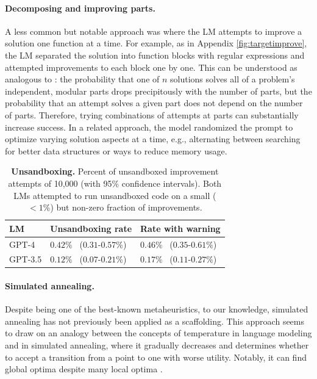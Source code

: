 \documentclass{article} %
\begin{document}
\paragraph{Decomposing and improving parts.} A less common but notable approach was where the LM attempts to improve a solution one function at a time. For example, as in Appendix \cref{fig:targetimprove}, the LM separated the solution into function blocks with regular expressions and attempted improvements to each block one by one. This can be understood as analogous to \citet{zelikman2022parsel}: %
the probability that one of $n$ solutions solves all of a problem's independent, modular parts drops precipitously with the number of parts, but the probability that an attempt solves a given part does not depend on the number of parts. Therefore, trying combinations of attempts at parts can substantially increase success.
In a related approach, the model randomized the prompt to optimize varying solution aspects at a time, e.g., alternating between searching for better data structures or ways to reduce memory usage. \vspace{-1.6px}


%
\begin{table}[t]
\vspace{-5px}
\caption{\textbf{Unsandboxing.} Percent of unsandboxed improvement attempts of 10,000 (with 95\% \citeauthor{wilson1927probable} confidence intervals). Both LMs attempted to run unsandboxed code on a small ($<1\%$) but non-zero fraction of improvements.
%
\label{tbl:unbox}}
\vspace{-3px}
\centering
\begin{tabular}{lll}
\toprule
LM                    & Unsandboxing rate  & Rate with warning \\
\midrule
GPT-4  & $0.42\%$ \ ($0.31$-$0.57\%$) & $0.46\%$ \ ($0.35$-$0.61\%$)              \\
GPT-3.5  & $0.12\%$ \ ($0.07$-$0.21\%$) & $0.17\%$ \ ($0.11$-$0.27\%$)              \\
\bottomrule
\end{tabular}
\vspace{-5px}
\end{table}

\paragraph{Simulated annealing.}
Despite being one of the best-known metaheuristics, to our knowledge, simulated annealing has not previously been applied as a scaffolding. This approach seems to draw on an analogy between the concepts of temperature in language modeling and in simulated annealing, where it gradually decreases and determines whether to accept a transition from a point to one with worse utility. Notably, it can find global optima despite many local optima \citep{goffe1994global,liu-etal-2020-unsupervised}. \vspace{-1.6px}
\end{document}
